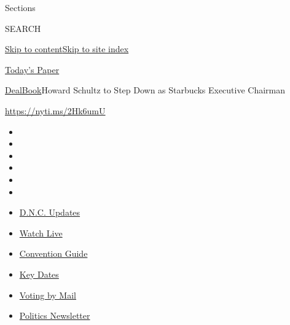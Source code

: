 Sections

SEARCH

\protect\hyperlink{site-content}{Skip to
content}\protect\hyperlink{site-index}{Skip to site index}

\href{https://myaccount.nytimes3xbfgragh.onion/auth/login?response_type=cookie\&client_id=vi}{}

\href{https://www.nytimes3xbfgragh.onion/section/todayspaper}{Today's
Paper}

\href{/section/business/dealbook}{DealBook}\textbar{}Howard Schultz to
Step Down as Starbucks Executive Chairman

\url{https://nyti.ms/2Hk6umU}

\begin{itemize}
\item
\item
\item
\item
\item
\item
\end{itemize}

\begin{itemize}
\item
  \href{https://www.nytimes3xbfgragh.onion/live/2020/08/17/us/dnc-convention?action=click\&pgtype=Article\&state=default\&region=TOP_BANNER\&context=storylines_menu}{D.N.C.
  Updates}
\item
  \href{https://www.nytimes3xbfgragh.onion/interactive/2020/08/17/us/politics/democratic-national-convention-live-stream-analysis.html?action=click\&pgtype=Article\&state=default\&region=TOP_BANNER\&context=storylines_menu}{Watch
  Live}
\item
  \href{https://www.nytimes3xbfgragh.onion/article/dnc-schedule.html?action=click\&pgtype=Article\&state=default\&region=TOP_BANNER\&context=storylines_menu}{Convention
  Guide}
\item
  \href{https://www.nytimes3xbfgragh.onion/interactive/2019/us/elections/2020-presidential-election-calendar.html?action=click\&pgtype=Article\&state=default\&region=TOP_BANNER\&context=storylines_menu}{Key
  Dates}
\item
  \href{https://www.nytimes3xbfgragh.onion/interactive/2020/08/11/us/politics/vote-by-mail-us-states.html?action=click\&pgtype=Article\&state=default\&region=TOP_BANNER\&context=storylines_menu}{Voting
  by Mail}
\item
  \href{https://www.nytimes3xbfgragh.onion/newsletters/politics?action=click\&pgtype=Article\&state=default\&region=TOP_BANNER\&context=storylines_menu}{Politics
  Newsletter}
\end{itemize}

